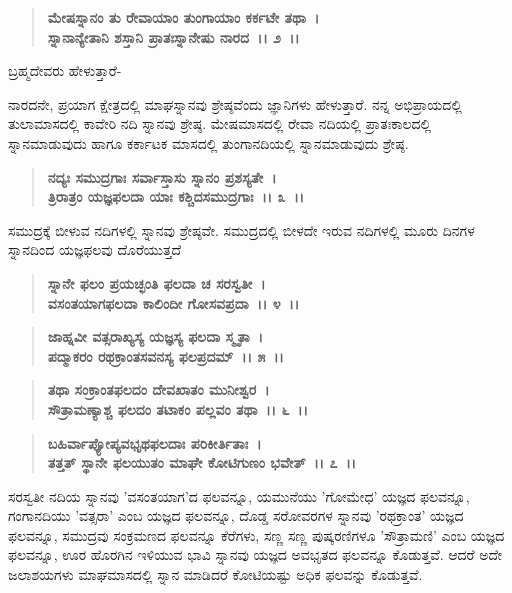\begin{verse}
\textbf{ಮೇಷಸ್ನಾನಂ ತು ರೇವಾಯಾಂ ತುಂಗಾಯಾಂ ಕರ್ಕಟೇ ತಥಾ~।}\\\textbf{ಸ್ನಾನಾನ್ಯೇತಾನಿ ಶಸ್ತಾನಿ ಪ್ರಾತಃಸ್ನಾನೇಷು ನಾರದ~।। ೨~।।}
\end{verse}

\begin{flushleft}
 ಬ್ರಹ್ಮದೇವರು ಹೇಳುತ್ತಾರೆ- 
\end{flushleft}

ನಾರದನೇ, ಪ್ರಯಾಗ ಕ್ಷೇತ್ರದಲ್ಲಿ ಮಾಘಸ್ನಾನವು ಶ್ರೇಷ್ಠವೆಂದು ಜ್ಞಾನಿಗಳು ಹೇಳುತ್ತಾರೆ. ನನ್ನ ಅಭಿಪ್ರಾಯದಲ್ಲಿ ತುಲಾಮಾಸದಲ್ಲಿ ಕಾವೇರಿ ನದಿ ಸ್ನಾನವು ಶ್ರೇಷ್ಠ. ಮೇಷಮಾಸದಲ್ಲಿ ರೇವಾ ನದಿಯಲ್ಲಿ ಪ್ರಾತಃಕಾಲದಲ್ಲಿ ಸ್ನಾನಮಾಡುವುದು ಹಾಗೂ ಕರ್ಕಾಟಕ ಮಾಸದಲ್ಲಿ ತುಂಗಾನದಿಯಲ್ಲಿ ಸ್ನಾನಮಾಡುವುದು ಶ್ರೇಷ್ಠ.

\begin{verse}
\textbf{ನದ್ಯಃ ಸಮುದ್ರಗಾಃ ಸರ್ವಾಸ್ತಾಸು ಸ್ನಾನಂ ಪ್ರಶಸ್ಯತೇ~।}\\\textbf{ತ್ರಿರಾತ್ರಂ ಯಜ್ಞಫಲದಾ ಯಾಃ ಕಶ್ಚಿದಸಮುದ್ರಗಾಃ~।। ೩~।। }
\end{verse}

ಸಮುದ್ರಕ್ಕೆ ಬೀಳುವ ನದಿಗಳಲ್ಲಿ ಸ್ನಾನವು ಶ್ರೇಷ್ಠವೇ. ಸಮುದ್ರದಲ್ಲಿ ಬೀಳದೇ ಇರುವ ನದಿಗಳಲ್ಲಿ ಮೂರು ದಿನಗಳ ಸ್ನಾನದಿಂದ ಯಜ್ಞಫಲವು ದೊರೆಯುತ್ತದೆ

\begin{verse}
\textbf{ಸ್ನಾನೇ ಫಲಂ ಪ್ರಯಚ್ಛಂತಿ ಫಲದಾ ಚ ಸರಸ್ವತೀ~।}\\\textbf{ವಸಂತಯಾಗಫಲದಾ ಕಾಲಿಂದೀ ಗೋಸವಪ್ರದಾ~।। ೪~।।} 
\end{verse}

\begin{verse}
\textbf{ಜಾಹ್ನವೀ ವತ್ಸರಾಖ್ಯಸ್ಯ ಯಜ್ಞಸ್ಯ ಫಲದಾ ಸ್ಮೃತಾ~।}\\\textbf{ಪದ್ಮಾಕರಂ ರಥಕ್ರಾಂತಸವನಸ್ಯ ಫಲಪ್ರದಮ್~।। ೫~।।} 
\end{verse}

\begin{verse}
\textbf{ತಥಾ ಸಂಕ್ರಾಂತಫಲದಂ ದೇವಖಾತಂ ಮುನೀಶ್ವರ~।}\\\textbf{ಸೌತ್ರಾಮಣ್ಯಾಶ್ಚ ಫಲದಂ ತಟಾಕಂ ಪಲ್ಲವಂ ತಥಾ~।। ೬~।।} 
\end{verse}

\begin{verse}
\textbf{ಬಹಿರ್ವಾಪ್ಯೋಪ್ಯವಭೃಥಫಲದಾಃ ಪರಿಕೀರ್ತಿತಾಃ~।}\\\textbf{ತತ್ತತ್ ಸ್ಥಾನೇ ಫಲಯುತಂ ಮಾಘೇ ಕೋಟಿಗುಣಂ ಭವೇತ್~।। ೭~।।}
\end{verse}

ಸರಸ್ವತೀ ನದಿಯ ಸ್ನಾನವು 'ವಸಂತಯಾಗ'ದ ಫಲವನ್ನೂ, ಯಮುನೆಯು 'ಗೋಮೇಧ' ಯಜ್ಞದ ಫಲವನ್ನೂ, ಗಂಗಾನದಿಯು 'ವತ್ಸರಾ' ಎಂಬ ಯಜ್ಞದ ಫಲವನ್ನೂ, ದೊಡ್ಡ ಸರೋವರಗಳ ಸ್ನಾನವು 'ರಥಕ್ರಾಂತ' ಯಜ್ಞದ ಫಲವನ್ನೂ, ಸಮುದ್ರವು ಸಂಕ್ರಮಣದ ಫಲವನ್ನೂ ಕೆರೆಗಳು, ಸಣ್ಣ ಸಣ್ಣ ಪುಷ್ಕರಣಿಗಳೂ 'ಸೌತ್ರಾಮಣಿ' ಎಂಬ ಯಜ್ಞದ ಫಲವನ್ನೂ, ಊರ ಹೊರಗಿನ ಇಳಿಯುವ ಭಾವಿ ಸ್ನಾನವು ಯಜ್ಞದ ಅವಭೃತದ ಫಲವನ್ನೂ ಕೊಡುತ್ತವೆ. ಆದರೆ ಅದೇ ಜಲಾಶಯಗಳು ಮಾಘಮಾಸದಲ್ಲಿ ಸ್ನಾನ ಮಾಡಿದರೆ ಕೋಟಿಯಷ್ಟು ಅಧಿಕ ಫಲವನ್ನು ಕೊಡುತ್ತವೆ.

